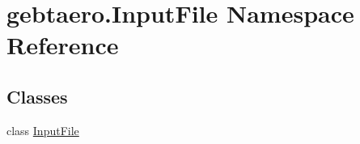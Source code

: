 \hypertarget{namespacegebtaero_1_1_input_file}{}\section{gebtaero.\+Input\+File Namespace Reference}
\label{namespacegebtaero_1_1_input_file}
\subsection*{Classes}
\begin{DoxyCompactItemize}
\item 
class \hyperlink{classgebtaero_1_1_input_file_1_1_input_file}{Input\+File}
\end{DoxyCompactItemize}
